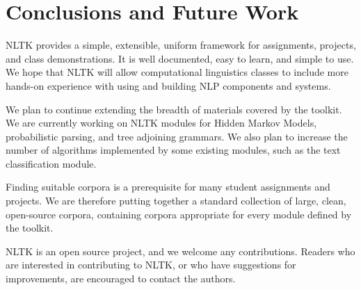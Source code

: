 \documentclass[11pt]{article}
\begin{document}
\section{Conclusions and Future Work}
\label{sec:conclusion}

NLTK provides a simple, extensible, uniform framework for
assignments, projects, and class demonstrations.  It is well documented, easy to
learn, and simple to use.  We hope that NLTK will allow computational
linguistics classes to include more hands-on experience with using and
building NLP components and systems.


We plan to continue extending the breadth of materials covered by the
toolkit.  We are currently working on NLTK modules for Hidden Markov
Models, probabilistic parsing, and tree adjoining grammars.  We also
plan to increase the number of algorithms implemented by some existing
modules, such as the text classification module.  

Finding suitable corpora is a prerequisite for many student
assignments and projects.  We are therefore putting together a
standard collection of large, clean, open-source corpora, containing
corpora appropriate for every module defined by the toolkit.

NLTK is an open source project, and we welcome any contributions.
Readers who are interested in contributing to NLTK, or who have
suggestions for improvements, are encouraged to contact the authors.




\end{document}
